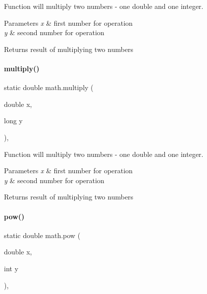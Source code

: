 Function will multiply two numbers -\/ one double and one integer. 


\begin{DoxyParams}{Parameters}
{\em x} & first number for operation \\
\hline
{\em y} & second number for operation \\
\hline
\end{DoxyParams}
\begin{DoxyReturn}{Returns}
result of multiplying two numbers 
\end{DoxyReturn}
\mbox{\label{classmath_afdcf0aa39976744ed21b47697dea0e55}} 
\paragraph{\texorpdfstring{multiply()}{multiply()}\hspace{0.1cm}{\footnotesize\ttfamily [4/4]}}
{\footnotesize\ttfamily static double math.\+multiply (\begin{DoxyParamCaption}\item[{double}]{x,  }\item[{long}]{y }\end{DoxyParamCaption})\hspace{0.3cm}{\ttfamily [inline]}, {\ttfamily [static]}}



Function will multiply two numbers -\/ one double and one integer. 


\begin{DoxyParams}{Parameters}
{\em x} & first number for operation \\
\hline
{\em y} & second number for operation \\
\hline
\end{DoxyParams}
\begin{DoxyReturn}{Returns}
result of multiplying two numbers 
\end{DoxyReturn}
\mbox{\label{classmath_ab3dbc5879cf9cb642f8394cea68785c8}} 
\paragraph{\texorpdfstring{pow()}{pow()}\hspace{0.1cm}{\footnotesize\ttfamily [1/2]}}
{\footnotesize\ttfamily static double math.\+pow (\begin{DoxyParamCaption}\item[{double}]{x,  }\item[{int}]{y }\end{DoxyParamCaption})\hspace{0.3cm}{\ttfamily [inline]}, {\ttfamily [static]}}


